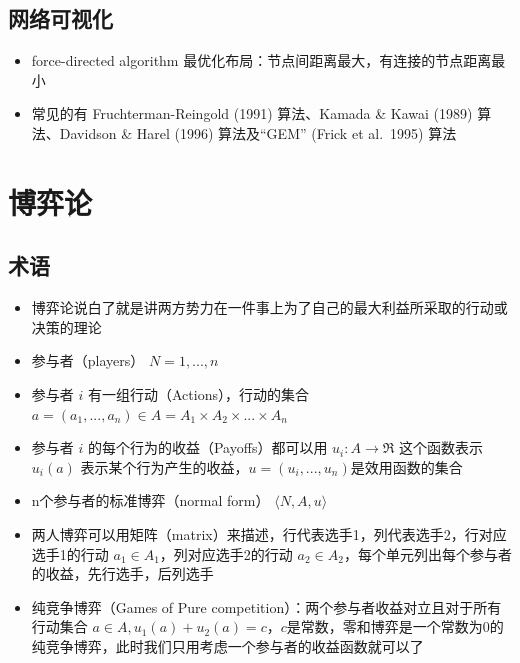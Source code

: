 \documentclass[
]{book}
\providecommand{\tightlist}{%
  \setlength{\itemsep}{0pt}\setlength{\parskip}{0pt}}
\begin{document}
\hypertarget{ux7f51ux7edcux53efux89c6ux5316}{%
\section{网络可视化}\label{ux7f51ux7edcux53efux89c6ux5316}}

\begin{itemize}
\tightlist
\item
  force-directed algorithm 最优化布局：节点间距离最大，有连接的节点距离最小
\item
  常见的有 Fruchterman-Reingold (1991) 算法、Kamada \& Kawai (1989) 算法、Davidson \& Harel (1996) 算法及``GEM'' (Frick et al.~1995) 算法
\end{itemize}

\hypertarget{game}{%
\chapter{博弈论}\label{game}}

\hypertarget{ux672fux8bed}{%
\section{术语}\label{ux672fux8bed}}

\begin{itemize}
\tightlist
\item
  博弈论说白了就是讲两方势力在一件事上为了自己的最大利益所采取的行动或决策的理论
\item
  参与者（players） \(N= {1,...,n}\)
\item
  参与者 \(i\) 有一组行动（Actions），行动的集合 \(a=(a_1,...,a_n) \in A=A_1 \times A_2 \times ... \times A_n\)
\item
  参与者 \(i\) 的每个行为的收益（Payoffs）都可以用 \(u_i:A \rightarrow \Re\) 这个函数表示 \(u_i(a)\) 表示某个行为产生的收益，\(u = (u_i,...,u_n)\)是效用函数的集合
\item
  n个参与者的标准博弈（normal form） \(\langle N,A,u \rangle\)
\item
  两人博弈可以用矩阵（matrix）来描述，行代表选手1，列代表选手2，行对应选手1的行动 \(a_1 \in A_1\)，列对应选手2的行动 \(a_2 \in A_2\)，每个单元列出每个参与者的收益，先行选手，后列选手
\item
  纯竞争博弈（Games of Pure competition）：两个参与者收益对立且对于所有行动集合 \(a \in A, u_1(a)+u_2(a) = c\)，\(c\)是常数，零和博弈是一个常数为0的纯竞争博弈，此时我们只用考虑一个参与者的收益函数就可以了
\end{itemize}
\end{document}
